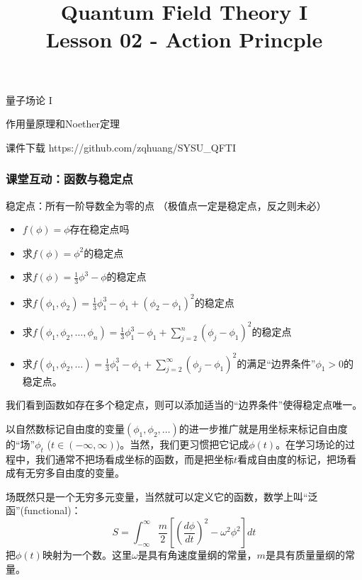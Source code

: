\documentclass[CJK]{beamer}
\title{Quantum Field Theory I \\ Lesson 02 - Action Princple}
\author{}
\date{}
\begin{document}
\begin{frame}
 
\begin{center}
\begin{Large}
\bch
量子场论 I 

{\vskip 0.3in}

作用量原理和Noether定理

\ech
\end{Large}
\end{center}

\vskip 0.2in

\bch
课件下载
\ech
https://github.com/zqhuang/SYSU\_QFTI

\end{frame}


\begin{frame}
\frametitle{\bch 课堂互动：函数与稳定点 \ech}
\bch
稳定点：所有一阶导数全为零的点 （极值点一定是稳定点，反之则未必）
\begin{itemize}
\item{$f(\phi) = \phi$存在稳定点吗}
\item{求$f(\phi) = \phi^2$的稳定点}
\item{求$f(\phi) = \frac{1}{3}\phi^3-\phi$的稳定点}
\item{求$f(\phi_1, \phi_2) = \frac{1}{3}\phi_1^3 - \phi_1 + (\phi_2-\phi_1)^2$的稳定点}
\item{求$f(\phi_1, \phi_2, \ldots, \phi_n) = \frac{1}{3}\phi_1^3 - \phi_1 + \sum_{j=2}^n(\phi_j - \phi_1)^2$的稳定点}
\item{求$f(\phi_1, \phi_2, \ldots) = \frac{1}{3}\phi_1^3 - \phi_1 + \sum_{j=2}^\infty(\phi_j - \phi_1)^2$的满足“边界条件”$\phi_1>0$的稳定点。}
\end{itemize}

\skipline

我们看到函数如存在多个稳定点，则可以添加适当的“边界条件”使得稳定点唯一。

\ech
\end{frame}

\begin{frame}
\bch
以自然数标记自由度的变量$(\phi_1, \phi_2, \ldots)$的进一步推广就是用坐标来标记自由度的“场”$\phi_t$ ($t\in (-\infty, \infty)$)。当然，我们更习惯把它记成$\phi(t)$。在学习场论的过程中，我们通常不把场看成坐标的函数，而是把坐标$t$看成自由度的标记，把场看成有无穷多自由度的变量。

\skipline

场既然只是一个无穷多元变量，当然就可以定义它的函数，数学上叫“泛函”(functional)：
\ech
\bex
\bch
$$ S = \int_{-\infty}^\infty \frac{m}{2}\left[(\frac{d\phi}{dt})^2 - \omega^2\phi^2\right] dt$$
把$\phi(t)$映射为一个数。这里$\omega$是具有角速度量纲的常量，$m$是具有质量量纲的常量。
\ech
\eex
\end{frame}
\end{document}
